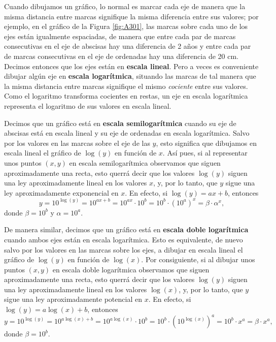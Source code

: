 \documentclass[
]{book}
\theoremstyle{definition}
\theoremstyle{definition}
\theoremstyle{definition}
\theoremstyle{remark}
\begin{document}
Cuando dibujamos un gráfico, lo normal es marcar cada eje de manera que la misma distancia entre marcas signifique la misma diferencia entre sus valores; por ejemplo, en el gráfico de la Figura \ref{fig:A301}, las marcas sobre cada uno de los ejes están igualmente espaciadas, de manera que entre cada par de marcas consecutivas en el eje de abscisas hay una diferencia de 2 años y entre cada par de marcas consecutivas en el eje de ordenadas hay una diferencia de 20 cm.
Decimos entonces que los ejes están
en \textbf{escala lineal}.
Pero a veces es conveniente dibujar algún eje en \textbf{escala logarítmica}, situando las marcas de tal manera que la misma distancia entre marcas signifique el mismo \emph{cociente} entre sus valores. Como el logaritmo transforma cocientes en restas, un eje en escala logarítmica representa el logaritmo de sus valores en escala lineal.

Decimos que un gráfico está en \textbf{escala semilogarítmica} cuando su eje de abscisas está en escala lineal y su eje de ordenadas en escala logarítmica. Salvo por los valores en las marcas sobre el eje de las \(y\), esto significa que dibujamos en escala lineal el gráfico de \(\log(y)\) en función de \(x\). Así pues, si al representar unos puntos \((x,y)\) en escala semilogarítmica observamos que siguen aproximadamente una recta, esto querrá decir que los valores \(\log(y)\) siguen una ley aproximadamente lineal en los valores \(x\), y, por lo tanto, que \(y\) sigue una ley aproximadamente exponencial en \(x\). En efecto, si \(\log(y)= ax+b\), entonces
\[
y=10^{\log(y)}= 10^{ax+b}=10^{ax}\cdot 10^{b}=10^{b}\cdot (10^{a})^{x}=\beta\cdot \alpha^x,
\]
donde \(\beta=10^b\) y \(\alpha=10^a\).

De manera similar, decimos que un gráfico está en \textbf{escala doble logarítmica} cuando ambos ejes están en escala logarítmica. Esto es equivalente, de nuevo salvo por los valores en las marcas sobre los ejes, a dibujar en escala lineal el gráfico de \(\log(y)\) en función de \(\log(x)\). Por consiguiente, si al dibujar unos puntos \((x,y)\) en escala doble logarítmica observamos que siguen aproximadamente una recta, esto querrá decir que los valores \(\log(y)\) siguen una ley aproximadamente lineal en los valores \(\log(x)\), y, por lo tanto, que \(y\) sigue una ley aproximadamente potencial en \(x\). En efecto, si \(\log(y)= a\log(x)+b\), entonces
\[
y=10^{\log(y)}= 10^{a\log(x)+b}=10^{a\log(x)}\cdot 10^{b}=10^{b}\cdot (10^{\log(x)})^{a}
=10^{b}\cdot x^{a}=\beta \cdot x^{a},
\]
donde \(\beta=10^b\).
\end{document}
